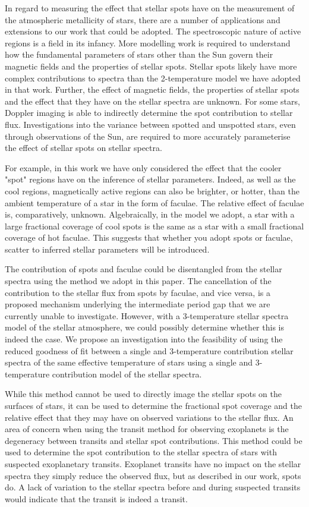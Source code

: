 In regard to measuring the effect that stellar spots have on the measurement of the atmospheric metallicity of stars, there are a number of applications and extensions to our work that could be adopted.
The spectroscopic nature of active regions is a field in its infancy.
More modelling work is required to understand how the fundamental parameters of stars other than the Sun govern their magnetic fields and the properties of stellar spots.
Stellar spots likely have more complex contributions to spectra than the 2-temperature model we have adopted in that work.
Further, the effect of magnetic fields, the properties of stellar spots and the effect that they have on the stellar spectra are unknown.
For some stars, Doppler imaging is able to indirectly determine the spot contribution to stellar flux.
Investigations into the variance between spotted and unspotted stars, even through observations of the Sun, are required to more accurately parameterise the effect of stellar spots on stellar spectra.

For example, in this work we have only considered the effect that the cooler "spot" regions have on the inference of stellar parameters.
Indeed, as well as the cool regions, magnetically active regions can also be brighter, or hotter, than the ambient temperature of a star in the form of faculae.
The relative effect of faculae is, comparatively, unknown.
Algebraically, in the model we adopt, a star with a large fractional coverage of cool spots is the same as a star with a small fractional coverage of hot faculae.
This suggests that whether you adopt spots or faculae, scatter to inferred stellar parameters will be introduced.

The contribution of spots and faculae could be disentangled from the stellar spectra using the method we adopt in this paper.
The cancellation of the contribution to the stellar flux from spots by faculae, and vice versa, is a proposed mechanism underlying the intermediate period gap that we are currently unable to investigate.
However, with a 3-temperature stellar spectra model of the stellar atmosphere, we could possibly determine whether this is indeed the case.
We propose an investigation into the feasibility of using the reduced goodness of fit between a single and 3-temperature contribution stellar spectra of the same effective temperature of stars using a single and 3-temperature contribution model of the stellar spectra.

While this method cannot be used to directly image the stellar spots on the surfaces of stars, it can be used to determine the fractional spot coverage and the relative effect that they may have on observed variations to the stellar flux.
An area of concern when using the transit method for observing exoplanets is the degeneracy between transits and stellar spot contributions.
This method could be used to determine the spot contribution to the stellar spectra of stars with suspected exoplanetary transits.
Exoplanet transits have no impact on the stellar spectra they simply reduce the observed flux, but as described in our work, spots do.
A lack of variation to the stellar spectra before and during suspected transits would indicate that the transit is indeed a transit.

